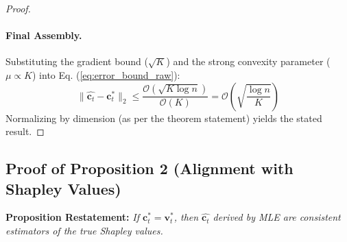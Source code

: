 \documentclass[11pt]{article}
\begin{document}
\begin{proof}
\paragraph{Final Assembly.}
Substituting the gradient bound ($\sqrt{K}$) and the strong convexity parameter ($\mu \propto K$) into Eq. (\ref{eq:error_bound_raw}):
\begin{equation}
    \|\hat{\mathbf{c}_t} - \mathbf{c}_t^*\|_2 \le \frac{\mathcal{O}(\sqrt{K \log n})}{\mathcal{O}(K)} = \mathcal{O}\left( \sqrt{\frac{\log n}{K}} \right)
\end{equation}
Normalizing by dimension (as per the theorem statement) yields the stated result.
\end{proof}

\subsection{Proof of Proposition 2 (Alignment with Shapley Values)}

\textbf{Proposition Restatement:} \textit{If $\mathbf{c}_t^* = \boldsymbol{v}_t^*$, then $\hat{\mathbf{c}_t}$ derived by MLE are consistent estimators of the true Shapley values.}
\end{document}
